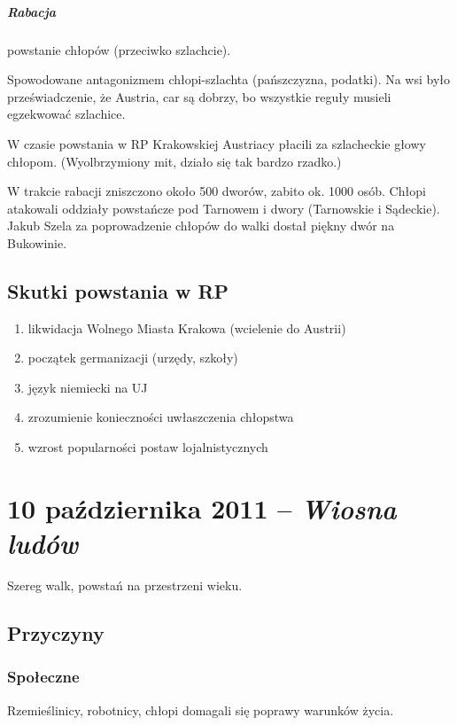 \documentclass [a4paper, 11pt, oneside]{book}
\begin{document}
        \paragraph{Rabacja} powstanie chłopów (przeciwko szlachcie).

        Spowodowane antagonizmem chłopi-szlachta (pańszczyzna, podatki). Na wsi było przeświadczenie, że Austria, car są dobrzy, bo wszystkie reguły musieli egzekwować szlachice.

        W czasie powstania w RP Krakowskiej Austriacy płacili za szlacheckie głowy chłopom. (Wyolbrzymiony mit, działo się tak bardzo rzadko.)

        W trakcie rabacji zniszczono około 500 dworów, zabito ok. 1000 osób. Chłopi atakowali oddziały powstańcze pod Tarnowem i dwory (Tarnowskie i Sądeckie). Jakub Szela za poprowadzenie chłopów do walki dostał piękny dwór na Bukowinie.
    \section{Skutki powstania w RP} %
    \label{sec:skutki_powstania_w_rp}
        \begin{enumerate}
            \item likwidacja Wolnego Miasta Krakowa (wcielenie do Austrii)
            \item początek germanizacji (urzędy, szkoły)
            \item język niemiecki na UJ
            \item zrozumienie konieczności uwłaszczenia chłopstwa
            \item wzrost popularności postaw lojalnistycznych
        \end{enumerate}
\chapter{10 października 2011 -- \textit{Wiosna ludów}} %
\label{cha:10_pa_dziernika_2011_textit}
Szereg walk, powstań na przestrzeni wieku.
    \section{Przyczyny} %
    \label{sec:przyczyny}
        \subsection{Społeczne} %
        \label{sub:spo_eczne}
            Rzemieślinicy, robotnicy, chłopi domagali się poprawy warunków życia.
\end{document}
